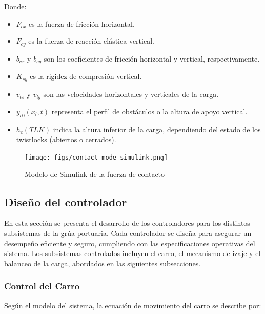 \documentclass{article}
\begin{document}
            Donde:
            \begin{itemize}
                \item $F_{cx}$ es la fuerza de fricción horizontal.
                \item $F_{cy}$ es la fuerza de reacción elástica vertical.
                \item $b_{cx}$ y $b_{cy}$ son los coeficientes de fricción horizontal y vertical, respectivamente.
                \item $K_{cy}$ es la rigidez de compresión vertical.
                \item $v_{lx}$ y $v_{ly}$ son las velocidades horizontales y verticales de la carga.
                \item $y_{c0}(x_l, t)$ representa el perfil de obstáculos o la altura de apoyo vertical.
                \item $h_c(TLK)$ indica la altura inferior de la carga, dependiendo del estado de los twistlocks (abiertos o cerrados).
            \end{itemize}

            \begin{figure}
                \centering
                \texttt{[image: figs/contact\_mode\_simulink.png]}
                \caption{Modelo de Simulink de la fuerza de contacto}
                \label{fig:contact_mode_simulink}
            \end{figure}
                
        \subsection{Diseño del controlador}

            En esta sección se presenta el desarrollo de los controladores para los distintos subsistemas de la grúa portuaria. Cada controlador se diseña para asegurar un desempeño eficiente y seguro, cumpliendo con las especificaciones operativas del sistema. Los subsistemas controlados incluyen el carro, el mecanismo de izaje y el balanceo de la carga, abordados en las siguientes subsecciones.

            \subsubsection{Control del Carro} 

            Según el modelo del sistema, la ecuación de movimiento del carro se describe por:
            
\end{document}
